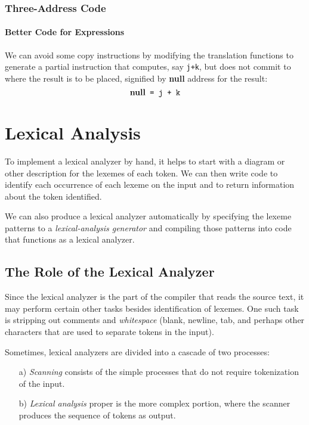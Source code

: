 \documentclass[a4paper,twoside]{book}
\begin{document}
\subsection{Three-Address Code}
\subsubsection{Better Code for Expressions}

We can avoid some copy instructions by modifying the translation functions to generate a partial instruction that computes, say \verb|j+k|, but does not commit to where the result is to be placed, signified by \textbf{null} address for the result:
\begin{equation}
    \textbf{null}\verb| = j + k|
\end{equation}

\chapter{Lexical Analysis}

To implement a lexical analyzer by hand, it helps to start with a diagram or other description for the lexemes of each token. We can then write code to identify each occurrence of each lexeme on the input and to return information about the token identified.

We can also produce a lexical analyzer automatically by specifying the lexeme patterns to a \textit{lexical-analysis generator} and compiling those patterns into code that functions as a lexical analyzer.

\section{The Role of the Lexical Analyzer}

Since the lexical analyzer is the part of the compiler that reads the source text, it may perform certain other tasks besides identification of lexemes. One such task is stripping out comments and \textit{whitespace} (blank, newline, tab, and perhaps other characters that are used to separate tokens in the input).

Sometimes, lexical analyzers are divided into a cascade of two processes:
\begin{itemize}
    \item[a)]\textit{Scanning} consists of the simple processes that do not require tokenization of the input.
    \item[b)]\textit{Lexical analysis} proper is the more complex portion, where the scanner produces the sequence of tokens as output.
\end{itemize}
\end{document}
